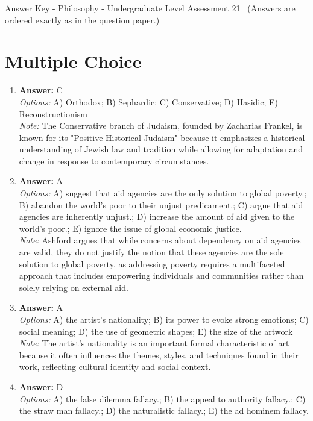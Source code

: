 \documentclass[12pt]{article}
\begin{document}
\begin{center}
Answer Key - Philosophy - Undergraduate Level Assessment 21 \
\small (Answers are ordered exactly as in the question paper.)
\end{center}

\section*{Multiple Choice}
\begin{enumerate}[label=\arabic*.]
\item \textbf{Answer:} C
\\ \textit{Options:} A) Orthodox; B) Sephardic; C) Conservative; D) Hasidic; E) Reconstructionism
\\ \textit{Note:} The Conservative branch of Judaism, founded by Zacharias Frankel, is known for its "Positive-Historical Judaism" because it emphasizes a historical understanding of Jewish law and tradition while allowing for adaptation and change in response to contemporary circumstances.
\item \textbf{Answer:} A
\\ \textit{Options:} A) suggest that aid agencies are the only solution to global poverty.; B) abandon the world's poor to their unjust predicament.; C) argue that aid agencies are inherently unjust.; D) increase the amount of aid given to the world's poor.; E) ignore the issue of global economic justice.
\\ \textit{Note:} Ashford argues that while concerns about dependency on aid agencies are valid, they do not justify the notion that these agencies are the sole solution to global poverty, as addressing poverty requires a multifaceted approach that includes empowering individuals and communities rather than solely relying on external aid.
\item \textbf{Answer:} A
\\ \textit{Options:} A) the artist's nationality; B) its power to evoke strong emotions; C) social meaning; D) the use of geometric shapes; E) the size of the artwork
\\ \textit{Note:} The artist's nationality is an important formal characteristic of art because it often influences the themes, styles, and techniques found in their work, reflecting cultural identity and social context.
\item \textbf{Answer:} D
\\ \textit{Options:} A) the false dilemma fallacy.; B) the appeal to authority fallacy.; C) the straw man fallacy.; D) the naturalistic fallacy.; E) the ad hominem fallacy.

\end{enumerate}
\end{document}
